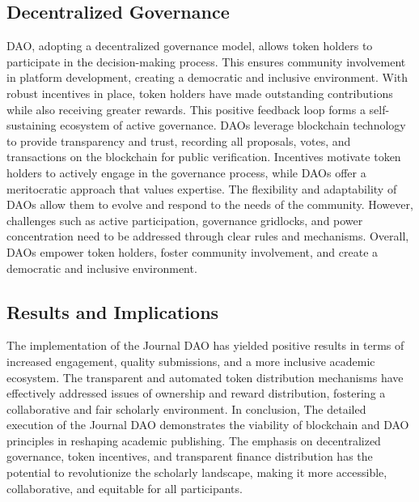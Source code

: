 \documentclass[lettersize,journal]{IEEEtran}
\begin{document}
\subsection{Decentralized Governance}

DAO, adopting a decentralized governance model, allows token holders to participate in the decision-making process. This ensures community involvement in platform development, creating a democratic and inclusive environment. With robust incentives in place, token holders have made outstanding contributions while also receiving greater rewards. This positive feedback loop forms a self-sustaining ecosystem of active governance. DAOs leverage blockchain technology to provide transparency and trust, recording all proposals, votes, and transactions on the blockchain for public verification. Incentives motivate token holders to actively engage in the governance process, while DAOs offer a meritocratic approach that values expertise. The flexibility and adaptability of DAOs allow them to evolve and respond to the needs of the community. However, challenges such as active participation, governance gridlocks, and power concentration need to be addressed through clear rules and mechanisms. Overall, DAOs empower token holders, foster community involvement, and create a democratic and inclusive environment.

\subsection{Results and Implications}

The implementation of the Journal DAO has yielded positive results in terms of increased engagement, quality submissions, and a more inclusive academic ecosystem. The transparent and automated token distribution mechanisms have effectively addressed issues of ownership and reward distribution, fostering a collaborative and fair scholarly environment.
In conclusion, The detailed execution of the Journal DAO demonstrates the viability of blockchain and DAO principles in reshaping academic publishing. The emphasis on decentralized governance, token incentives, and transparent finance distribution has the potential to revolutionize the scholarly landscape, making it more accessible, collaborative, and equitable for all participants.
\end{document}
